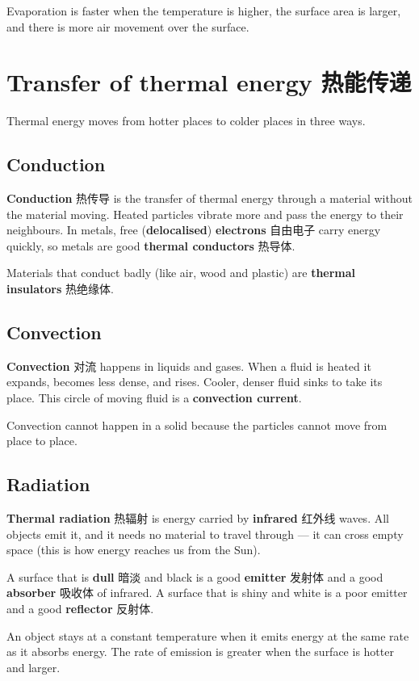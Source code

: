\documentclass[11pt]{article}
\begin{document}
Evaporation is faster when the temperature is higher, the surface area is larger, and there is more air movement over the surface.

\section*{Transfer of thermal energy 热能传递}

Thermal energy moves from hotter places to colder places in three ways.

\subsection*{Conduction}

\textbf{Conduction} 热传导 is the transfer of thermal energy through a material without the material moving. Heated particles vibrate more and pass the energy to their neighbours. In metals, free (\textbf{delocalised}) \textbf{electrons} 自由电子 carry energy quickly, so metals are good \textbf{thermal conductors} 热导体.

Materials that conduct badly (like air, wood and plastic) are \textbf{thermal insulators} 热绝缘体.

\subsection*{Convection}

\textbf{Convection} 对流 happens in liquids and gases. When a fluid is heated it expands, becomes less dense, and rises. Cooler, denser fluid sinks to take its place. This circle of moving fluid is a \textbf{convection current}.

Convection cannot happen in a solid because the particles cannot move from place to place.

\subsection*{Radiation}

\textbf{Thermal radiation} 热辐射 is energy carried by \textbf{infrared} 红外线 waves. All objects emit it, and it needs no material to travel through — it can cross empty space (this is how energy reaches us from the Sun).

A surface that is \textbf{dull} 暗淡 and black is a good \textbf{emitter} 发射体 and a good \textbf{absorber} 吸收体 of infrared. A surface that is shiny and white is a poor emitter and a good \textbf{reflector} 反射体.

An object stays at a constant temperature when it emits energy at the same rate as it absorbs energy. The rate of emission is greater when the surface is hotter and larger.
\end{document}
